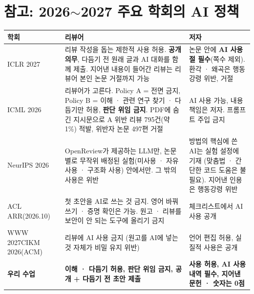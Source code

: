 \documentclass[11pt]{article}
\begin{document}
\section*{참고: 2026$\sim$2027 주요 학회의 AI 정책}
\begin{center}
\scriptsize
\renewcommand{\arraystretch}{1.35}
\begin{tabular}{@{}>{\raggedright\arraybackslash}p{2.0cm}>{\raggedright\arraybackslash}p{5.9cm}>{\raggedright\arraybackslash}p{5.3cm}@{}}
\toprule
\textbf{학회} & \textbf{리뷰어} & \textbf{저자} \\
\midrule
ICLR 2027 & 리뷰 작성을 돕는 제한적 사용 허용. \textbf{공개 의무}, 다듬기 전 원래 글과 AI 대화를 함께 제출. 지어낸 내용이 들어간 리뷰는 리뷰어 본인 논문 거절까지 가능 & 논문 안에 \textbf{AI 사용 절 필수}(쪽수 제외). 환각 · 왜곡은 행동강령 위반, 거절 \\
ICML 2026 & 리뷰어가 고른다. Policy A = 전면 금지, Policy B = 이해 · 관련 연구 찾기 · 다듬기만 허용, \textbf{판단 위임 금지}. PDF에 숨긴 지시문으로 A 위반 리뷰 795건(약 1\%) 적발, 위반자 논문 497편 거절 & AI 사용 가능, 내용 책임은 저자. 프롬프트 주입 금지 \\
NeurIPS 2026 & OpenReview가 제공하는 LLM만, 논문별로 무작위 배정된 실험(미사용 · 자유 사용 · 구조화 사용) 안에서만. 그 밖의 사용은 위반 & 방법의 핵심에 쓴 AI는 실험 설정에 기재 (맞춤법 · 간단한 코드 도움은 불필요). 지어낸 인용은 행동강령 위반 \\
ACL ARR\newline (2026.10) & 첫 초안을 AI로 쓰는 것 금지. 영어 바꿔 쓰기 · 증명 확인은 가능. 원고 · 리뷰를 보안이 안 되는 도구에 올리기 금지 & 체크리스트에서 AI 사용 공개 \\
WWW 2027\newline CIKM 2026\newline (ACM) & 리뷰에 AI 사용 금지 (원고를 AI에 넣는 것 자체가 비밀 유지 위반) & 언어 편집 허용, 실질적 사용은 공개 \\
\midrule
\textbf{우리 수업} & \textbf{이해 · 다듬기 허용, 판단 위임 금지, 공개 + 다듬기 전 초안 제출} & \textbf{사용 허용, AI 사용 내역 필수, 지어낸 문헌 · 숫자는 0점} \\
\bottomrule
\end{tabular}
\end{center}
\end{document}
